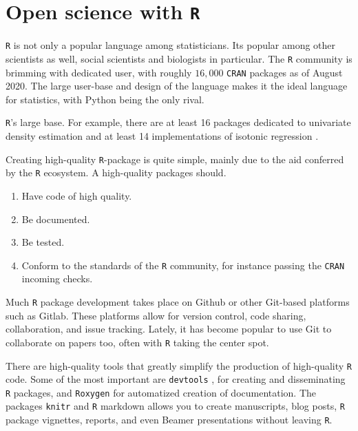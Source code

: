 \section{Open science with \texttt{R}}

\texttt{R} is not only a popular language among statisticians. Its popular among other scientists as well, social scientists and biologists in particular. The \texttt{R} community is brimming with dedicated user, with roughly $16,000$ \texttt{CRAN} packages as of August 2020. The large user-base and design of the language makes it the ideal language for statistics, with Python being the only rival.

\texttt{R}'s large base. For example, there are at least 16 packages dedicated to univariate density estimation \parencite{Deng2011-bk} and at least 14 implementations of isotonic regression \parencite{Busing2019-tv}. 

Creating high-quality \texttt{R}-package is quite simple, mainly due to the aid conferred by the \texttt{R} ecosystem. A high-quality packages should.

\begin{enumerate}
\item Have code of high quality.
\item Be documented.
\item Be tested.
\item Conform to the standards of the \texttt{R} community, for instance passing the \texttt{CRAN} incoming checks.
\end{enumerate}



Much \texttt{R} package development takes place on Github or other Git-based platforms such as Gitlab. These platforms allow for version control, code sharing, collaboration, and issue tracking. Lately, it has become popular to use Git to collaborate on papers too, often with \texttt{R} taking the center spot.

There are high-quality tools that greatly simplify the production of high-quality \texttt{R} code. Some of the most important are \texttt{devtools} \parencite{devtools}, for creating and disseminating \texttt{R} packages, and \texttt{Roxygen} \parencite{roxygen2} for automatized creation of documentation. The packages \texttt{knitr} \parencite{Xie2014} and \texttt{R} markdown allows you to create manuscripts, blog posts, \texttt{R} package vignettes, reports, and even Beamer presentations without leaving \texttt{R}.

